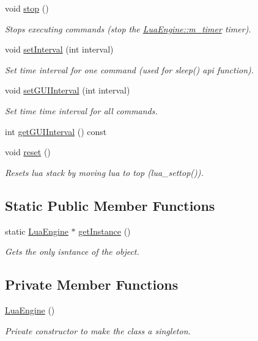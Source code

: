 \begin{DoxyCompactItemize}
void \hyperlink{class_lua_engine_a5822af655fb7b474766e39b44be56a6a}{stop} ()
\begin{DoxyCompactList}\small\item\em Stops executing commands (stop the \hyperlink{class_lua_engine_a367284a1461c5a2d2804c3f9b4d94f14}{Lua\-Engine\-::m\-\_\-timer} timer). \end{DoxyCompactList}\item 
void \hyperlink{class_lua_engine_a0b87a8b474070665af6e435a2c5bce56}{set\-Interval} (int interval)
\begin{DoxyCompactList}\small\item\em Set time interval for one command (used for sleep() api function). \end{DoxyCompactList}\item 
void \hyperlink{class_lua_engine_ac29f2b09b45797aac68bd5caa6fe2c90}{set\-G\-U\-I\-Interval} (int interval)
\begin{DoxyCompactList}\small\item\em Set time time interval for all commands. \end{DoxyCompactList}\item 
int \hyperlink{class_lua_engine_a613b53ffedc45c8cf800e99aa42408c5}{get\-G\-U\-I\-Interval} () const 
\item 
void \hyperlink{class_lua_engine_ab598de2b82cdf3ea3c67244669a31194}{reset} ()
\begin{DoxyCompactList}\small\item\em Resets lua stack by moving lua to top (lua\-\_\-settop()). \end{DoxyCompactList}\end{DoxyCompactItemize}
\subsection*{Static Public Member Functions}
\begin{DoxyCompactItemize}
\item 
static \hyperlink{class_lua_engine}{Lua\-Engine} $\ast$ \hyperlink{class_lua_engine_aded58f5432b1e6598ad3c82ea2e5c0b4}{get\-Instance} ()
\begin{DoxyCompactList}\small\item\em Gets the only isntance of the object. \end{DoxyCompactList}\end{DoxyCompactItemize}
\subsection*{Private Member Functions}
\begin{DoxyCompactItemize}
\item 
\hyperlink{class_lua_engine_a165d91bae4bef0670afd6f73a3e7e6a7}{Lua\-Engine} ()
\begin{DoxyCompactList}\small\item\em Private constructor to make the class a singleton. \end{DoxyCompactList}\end{DoxyCompactItemize}
